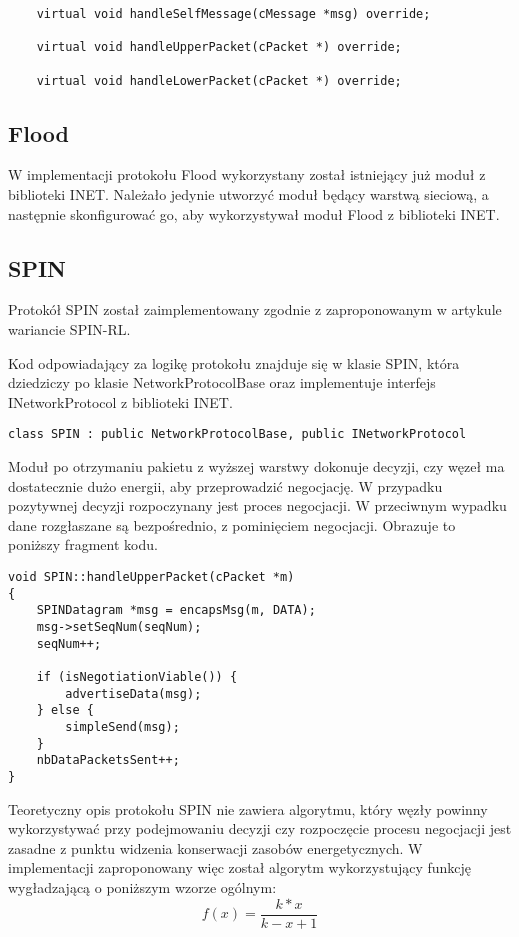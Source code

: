 \begin{verbatim}
    virtual void handleSelfMessage(cMessage *msg) override;

    virtual void handleUpperPacket(cPacket *) override;

    virtual void handleLowerPacket(cPacket *) override;
\end{verbatim}
\subsection{Flood}
W implementacji protokołu Flood wykorzystany został istniejący już moduł z biblioteki INET. Należało jedynie utworzyć  moduł będący warstwą sieciową, a następnie skonfigurować go, aby wykorzystywał moduł Flood z biblioteki INET.
\subsection{SPIN}
Protokół SPIN został zaimplementowany zgodnie z zaproponowanym w artykule \cite{Kulik2002} wariancie SPIN-RL.

Kod odpowiadający za logikę protokołu znajduje się w klasie SPIN, która dziedziczy po klasie NetworkProtocolBase oraz implementuje interfejs INetworkProtocol z biblioteki INET.

\begin{verbatim}
class SPIN : public NetworkProtocolBase, public INetworkProtocol
\end{verbatim}

Moduł po otrzymaniu pakietu z wyższej warstwy dokonuje decyzji, czy węzeł ma dostatecznie dużo energii, aby przeprowadzić negocjację. W przypadku pozytywnej decyzji rozpoczynany jest proces negocjacji. W przeciwnym wypadku dane rozgłaszane są bezpośrednio, z pominięciem negocjacji. Obrazuje to poniższy fragment kodu.

\begin{verbatim}
void SPIN::handleUpperPacket(cPacket *m)
{
    SPINDatagram *msg = encapsMsg(m, DATA);
    msg->setSeqNum(seqNum);
    seqNum++;

    if (isNegotiationViable()) {
        advertiseData(msg);
    } else {
        simpleSend(msg);
    }
    nbDataPacketsSent++;
}
\end{verbatim}

Teoretyczny opis protokołu SPIN nie zawiera algorytmu, który węzły powinny wykorzystywać przy podejmowaniu decyzji czy rozpoczęcie procesu negocjacji jest zasadne z punktu widzenia konserwacji zasobów energetycznych. W implementacji zaproponowany więc został algorytm wykorzystujący funkcję wygładzającą o poniższym wzorze ogólnym:
\[
	f(x) = \frac{k*x}{k - x + 1}
\]

